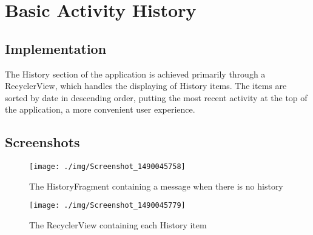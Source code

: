 \documentclass[report.tex]{subfiles}
\begin{document}
\section{Basic Activity History} %
\label{sec:basic_activity_history}
\subsection{Implementation} %
\label{sub:implementation_2}
The History section of the application is achieved primarily through a
RecyclerView, which handles the displaying of History items. The items are
sorted by date in descending order, putting the most recent activity at the top
of the application, a more convenient user experience.

\subsection{Screenshots} %
\label{sub:screenshots_2}
\begin{figure}[H]
    \centering
    \texttt{[image: ./img/Screenshot\_1490045758]}
    \caption{The HistoryFragment containing a message when there is no history}
\end{figure}

\begin{figure}[H]
    \centering
    \texttt{[image: ./img/Screenshot\_1490045779]}
    \caption{The RecyclerView containing each History item}
\end{figure}

\newpage
\end{document}
